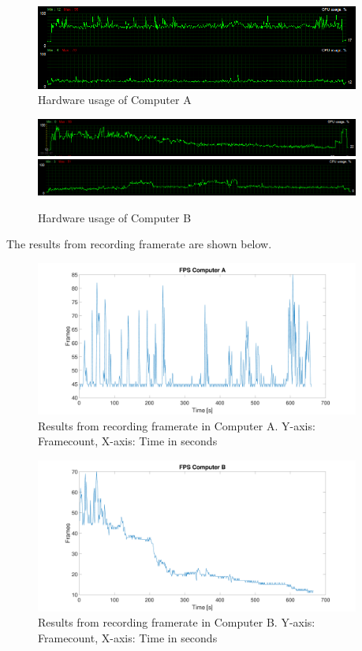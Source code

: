 \begin{figure}[H]
\centering
\includegraphics[width=0.95\textwidth]{InternalTest/B_usage.PNG}
\caption{Hardware usage of Computer A}
\end{figure}

\begin{figure}[H]
\centering
\includegraphics[width=0.95\textwidth]{InternalTest/C_gpu.PNG}
\includegraphics[width=0.95\textwidth]{InternalTest/C_cpu.PNG}
\caption{Hardware usage of Computer B}
\end{figure}

The results from recording framerate are shown below. 

\begin{figure}[H]
\centering
\includegraphics[width=0.95\textwidth]{InternalTest/A_fps.pdf}
\caption{Results from recording framerate in Computer A. Y-axis: Framecount, X-axis: Time in seconds}
\end{figure}

\begin{figure}[H]
\centering
\includegraphics[width=0.95\textwidth]{InternalTest/B_fps.pdf}
\caption{Results from recording framerate in Computer B. Y-axis: Framecount, X-axis: Time in seconds}
\end{figure}


